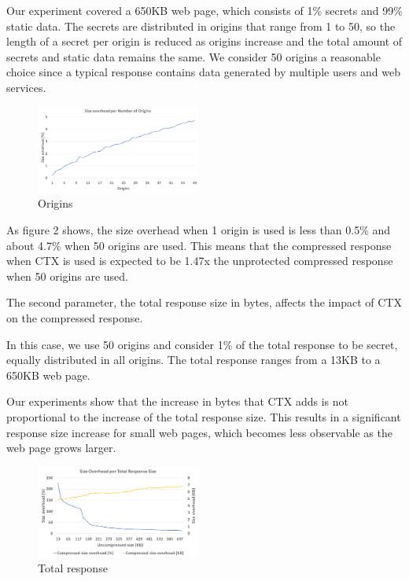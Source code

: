 \documentclass[conference, letterpaper, 10pt]{IEEEtran}
\begin{document}
Our experiment covered a 650KB web page, which consists of 1\% secrets and 99\%
static data. The secrets are distributed in origins that range from 1 to 50, so
the length of a secret per origin is reduced as origins increase and the total
amount of secrets and static data remains the same. We consider 50 origins a
reasonable choice since a typical response contains data generated by multiple
users and web services.

   \begin{figure}[thpb]
      \centering
      \includegraphics[width=0.48\textwidth]{experiments/origins.png}
      \caption{Origins}
   \end{figure}

As figure 2 shows, the size overhead when 1 origin is used is less than 0.5\%
and about 4.7\% when 50 origins are used. This means that the compressed
response when CTX is used is expected to be 1.47x the unprotected compressed
response when 50 origins are used.

The second parameter, the total response size in bytes, affects the impact of
CTX on the compressed response.

In this case, we use 50 origins and consider 1\% of the total response to be
secret, equally distributed in all origins. The total response ranges from a
13KB to a 650KB web page.

Our experiments show that the increase in bytes that CTX adds is not
proportional to the increase of the total response size. This results in a
significant response size increase for small web pages, which becomes less
observable as the web page grows larger.

   \begin{figure}[thpb]
      \centering
      \includegraphics[width=0.48\textwidth]{experiments/total_response.png}
      \caption{Total response}
   \end{figure}
\end{document}
